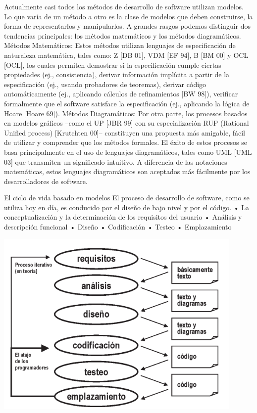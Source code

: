 Actualmente casi todos los métodos de desarrollo de software utilizan modelos. Lo que varía de un método a otro es la clase de modelos que deben construirse, la forma de representarlos y manipularlos. A grandes rasgos podemos distinguir dos tendencias principales: los métodos matemáticos y los métodos diagramáticos.
Métodos Matemáticos:
Estos métodos utilizan lenguajes de especificación de naturaleza matemática, tales como: Z [DB 01], VDM [EF 94], B [BM 00] y OCL [OCL], los cuales permiten demostrar si la especificación cumple ciertas propiedades (ej., consistencia), derivar información implícita a partir de la especificación (ej., usando probadores de teoremas), derivar código automáticamente (ej., aplicando cálculos de refinamientos [BW 98]), verificar formalmente que el software satisface la especificación (ej., aplicando la lógica de Hoare [Hoare 69]).
Métodos Diagramáticos:
Por otra parte, los procesos basados en modelos gráficos –como el UP [JBR 99] con su especialización RUP (Rational Unified process) [Krutchten 00]– constituyen una propuesta más amigable, fácil de utilizar y comprender que los métodos formales. El éxito de estos procesos se basa principalmente en el uso de lenguajes diagramáticos, tales como UML [UML 03] que transmiten un significado intuitivo. A diferencia de las notaciones matemáticas, estos lenguajes diagramáticos son aceptados más fácilmente por los desarrolladores de software.

El ciclo de vida basado en modelos
El proceso de desarrollo de software, como se utiliza hoy en día, es conducido por el diseño de bajo nivel y por el código.
•	La conceptualización y la determinación de los requisitos del usuario 
•	Análisis y descripción funcional 
•	Diseño 
•	Codificación
•	Testeo 
•	Emplazamiento

\begin{center}
    \includegraphics[width=12cm]{./Imagenes/mdd2}
    \end{center}

